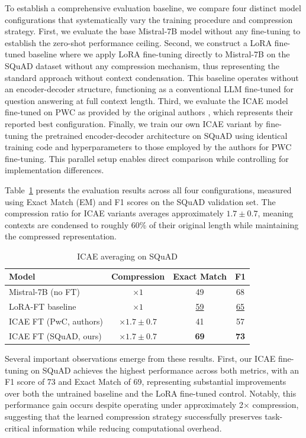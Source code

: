 To establish a comprehensive evaluation baseline, we compare four distinct model configurations that systematically vary the training procedure and compression strategy.
First, we evaluate the base Mistral-7B model \cite{mistral7b} without any fine-tuning to establish the zero-shot performance ceiling.
Second, we construct a LoRA fine-tuned baseline where we apply LoRA fine-tuning directly to Mistral-7B on the SQuAD dataset without any compression mechanism, thus representing the standard approach without context condensation.
This baseline operates without an encoder-decoder structure, functioning as a conventional LLM fine-tuned for question answering at full context length.
Third, we evaluate the ICAE model fine-tuned on PWC as provided by the original authors \cite{ge_-context_2024}, which represents their reported best configuration.
Finally, we train our own ICAE variant by fine-tuning the pretrained encoder-decoder architecture on SQuAD using identical training code and hyperparameters to those employed by the authors for PWC fine-tuning.
This parallel setup enables direct comparison while controlling for implementation differences.

Table~\ref{tab:icae_squad} presents the evaluation results across all four configurations, measured using Exact Match (EM) and F1 scores on the SQuAD validation set.
The compression ratio for ICAE variants averages approximately $1.7 \pm 0.7$, meaning contexts are condensed to roughly 60\% of their original length while maintaining the compressed representation.
\begin{table}[h]
    \centering
    \begin{tabular}{lccc}
        \toprule
        \textbf{Model} &
        \textbf{Compression} &
        \textbf{Exact Match} &
        \textbf{F1} \\
        \midrule
        Mistral-7B (no FT)          & ×$1$         & 49 & 68 \\
        LoRA-FT baseline            & ×$1$         & \underline{59} & \underline{65} \\
        ICAE FT (PwC, authors)       & ×$1.7\pm0.7$ & 41 & 57 \\
        ICAE FT (SQuAD, ours)              & ×$1.7\pm0.7$ & \textbf{69} & \textbf{73} \\
        \bottomrule
    \end{tabular}
    \caption{ICAE averaging on SQuAD}
    \label{tab:icae_squad}
\end{table}

Several important observations emerge from these results.
First, our ICAE fine-tuning on SQuAD achieves the highest performance across both metrics, with an F1 score of 73 and Exact Match of 69, representing substantial improvements over both the untrained baseline and the LoRA fine-tuned control.
Notably, this performance gain occurs despite operating under approximately 2× compression, suggesting that the learned compression strategy successfully preserves task-critical information while reducing computational overhead.

